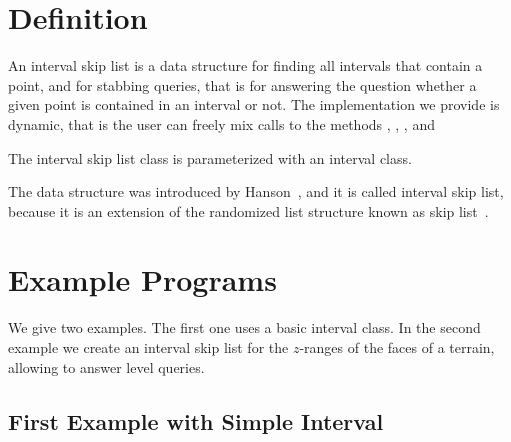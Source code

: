 
\ccParDims



\minitoc



\section{Definition}
  
An interval skip list is a data structure for finding all intervals 
that contain a point, and for stabbing queries, that is for answering 
the question whether a given point is contained in an interval or not. 
The implementation we provide is dynamic, that is the user can freely
mix calls  to the methods , , 
, and 

The interval skip list class is parameterized with an interval class.

The data structure was introduced by Hanson~\cite{h-islds-91}, and it is called
interval skip list, because it is an extension of the randomized list
structure known as skip list~\cite{p-slpab-90}.
 
\section{Example Programs}
\label{sectionIntervalskiplistExamples}

We give two examples. The first one uses a basic interval class.  In
the second example we create an interval skip list for the $z$-ranges
of the faces of a terrain, allowing to answer level queries.

\subsection{First Example with Simple Interval}

